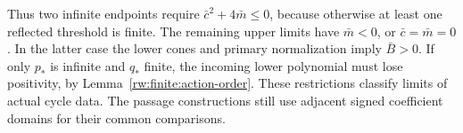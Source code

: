 Thus two infinite endpoints require $\bar c^2+4\bar m\le0$,
because otherwise at least one reflected threshold is finite.
The remaining upper limits have $\bar m<0$, or
$\bar c=\bar m=0$. In the latter case the lower cones and primary
normalization imply $\bar B>0$. If only $p_*$ is infinite and
$q_*$ finite, the incoming lower polynomial must lose positivity,
by Lemma~\ref{rw:finite:action-order}. These restrictions classify
limits of actual cycle data. The passage constructions still use
adjacent signed coefficient domains for their common comparisons.
